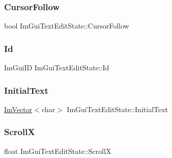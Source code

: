 \hypertarget{struct_im_gui_text_edit_state_add85da462dc5bbb0295ae28ebec2ec5d}{}\label{struct_im_gui_text_edit_state_add85da462dc5bbb0295ae28ebec2ec5d} 
\subsubsection{\texorpdfstring{Cursor\+Follow}{CursorFollow}}
{\footnotesize\ttfamily bool Im\+Gui\+Text\+Edit\+State\+::\+Cursor\+Follow}

\hypertarget{struct_im_gui_text_edit_state_a72607b084143b202b03fd495b0eded2c}{}\label{struct_im_gui_text_edit_state_a72607b084143b202b03fd495b0eded2c} 
\subsubsection{\texorpdfstring{Id}{Id}}
{\footnotesize\ttfamily Im\+Gui\+ID Im\+Gui\+Text\+Edit\+State\+::\+Id}

\hypertarget{struct_im_gui_text_edit_state_aba698d67719db7a6954475292cf50d28}{}\label{struct_im_gui_text_edit_state_aba698d67719db7a6954475292cf50d28} 
\subsubsection{\texorpdfstring{Initial\+Text}{InitialText}}
{\footnotesize\ttfamily \hyperlink{class_im_vector}{Im\+Vector}$<$char$>$ Im\+Gui\+Text\+Edit\+State\+::\+Initial\+Text}

\hypertarget{struct_im_gui_text_edit_state_ace66da7fa5fc21a7faabe2696d366e22}{}\label{struct_im_gui_text_edit_state_ace66da7fa5fc21a7faabe2696d366e22} 
\subsubsection{\texorpdfstring{ScrollX}{ScrollX}}
{\footnotesize\ttfamily float Im\+Gui\+Text\+Edit\+State\+::\+ScrollX}

